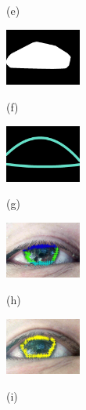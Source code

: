 \documentclass[sigconf]{acmart}
\begin{document}
\begin{figure}[t]
\begin{minipage}[b]{0.32\linewidth}
  \centerline{(e)}\medskip
\end{minipage}
\hfill
\begin{minipage}[b]{0.32\linewidth}
  \centering
  \centerline{\includegraphics[width=2.5cm]{../Fig/EyelidDetection/ValleyPeakField.jpg}}
  \centerline{(f)}\medskip
\end{minipage}
\hfill
\begin{minipage}[b]{0.32\linewidth}
  \centering
  \centerline{\includegraphics[width=2.5cm]{../Fig/EyelidDetection/Eyelid_Result.jpg}}
  \centerline{(g)}\medskip
\end{minipage}
\hfill
\begin{minipage}[b]{0.32\linewidth}
  \centering
  \centerline{\includegraphics[width=2.5cm]{../Fig/ClipFeaturePts/ClipFeaturePointsDisp.jpg}}
  \centerline{(h)}\medskip
\end{minipage}
\hfill
\begin{minipage}[b]{0.32\linewidth}
  \centering
  \centerline{\includegraphics[width=2.5cm]{../Fig/ExactIrisCenter/RefinedFeaturePts.jpg}}
  \centerline{(i)}\medskip
\end{minipage}


\end{figure}
\end{document}

